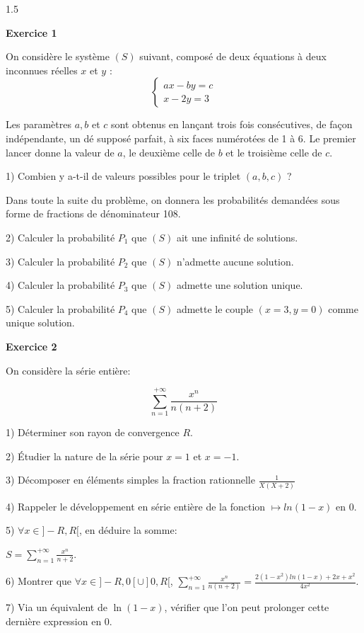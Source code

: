 \documentclass[12pt]{article}
\begin{document}
\begin{spacing}{1.5}

\textbf{Exercice 1}

On considère le système $(S)$ suivant, composé de deux équations à deux inconnues 
réelles $x$ et $y$ :
\medskip
\[\begin{cases}
ax-by=c\\
x-2y=3
\end{cases}\]

 Les paramètres $a, b$ et $c$ sont obtenus en lançant trois fois consécutives, de façon indépendante, un dé supposé parfait, à six faces numérotées de 1 à 6. Le premier lancer donne la valeur de $a$, le deuxième celle de $b$ et le troisième celle de $c$. 

1) Combien y a-t-il de valeurs possibles pour le triplet $(a, b, c)$ ? 

Dans toute la suite du problème, on donnera les probabilités demandées sous 
forme de fractions de dénominateur 108. 

2) Calculer la probabilité $P_1$ que $(S)$ ait une infinité de solutions. 

3) Calculer la probabilité $P_2$ que $(S)$ n'admette aucune solution. 

4) Calculer la probabilité $P_3$ que $(S)$ admette une solution unique. 

5) Calculer la probabilité $P_4$ que $(S)$ admette le couple $(x = 3, y = 0)$ comme unique 
solution. 

\medskip\textbf{Exercice 2 }

On considère la série entière:

\[\sum_{n=1}^{+\infty}\frac{x^n}{n(n+2)}\]

1) Déterminer son rayon de convergence $R$.

2) Étudier la nature de la série pour $x=1$ et $x=-1$.

3) Décomposer en éléments simples la fraction rationnelle $\frac{1}{X(X+2)}$

4) Rappeler le développement en série entière de la fonction $\longmapsto ln(1-x)$ en 0.

5) $\forall x\in ]-R,R[$, en déduire la somme:

$S=\sum_{n=1}^{+\infty}\frac{x^n}{n+2}$.

6) Montrer que $\forall x\in ]-R,0[\cup ]0,R[$, $\sum_{n=1}^{+\infty}\frac{x^n}{n(n+2)}=\frac{2(1-x^2)ln(1-x)+2x+x^2}{4x^2}$.

7) Via un équivalent de $\ln(1-x)$, vérifier que l'on peut prolonger cette dernière expression en 0.


\end{spacing}
\end{document}
